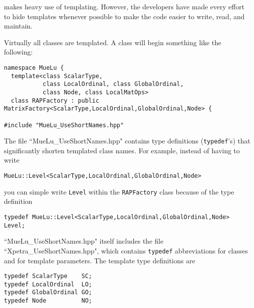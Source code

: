 \muelu makes heavy use of templating.  However, the developers have made every effort to hide templates
whenever possible to make the code easier to write, read, and maintain.

Virtually all \muelu classes are templated.  A class will begin something like the following:

\begin{verbatim}
namespace MueLu {
  template<class ScalarType,
           class LocalOrdinal, class GlobalOrdinal,
           class Node, class LocalMatOps>
  class RAPFactory : public MatrixFactory<ScalarType,LocalOrdinal,GlobalOrdinal,Node> {

#include "MueLu_UseShortNames.hpp"
\end{verbatim}
%
The file ``MueLu\_UseShortNames.hpp" contains type definitions (\verb!typedef!'s) that significantly shorten
templated class names.  For example, instead of having to write
\begin{verbatim}
MueLu::Level<ScalarType,LocalOrdinal,GlobalOrdinal,Node>
\end{verbatim}
you can simple write \verb!Level!  within the \verb!RAPFactory! class because of the type definition
\begin{verbatim}
typedef MueLu::Level<ScalarType,LocalOrdinal,GlobalOrdinal,Node> Level;
\end{verbatim}
``MueLu\_UseShortNames.hpp" itself includes the file ``Xpetra\_UseShortNames.hpp", which contains
\verb!typedef! abbreviations for \xpetra classes and for template parameters.  The template
type definitions are
%
\begin{verbatim}
typedef ScalarType    SC;
typedef LocalOrdinal  LO;
typedef GlobalOrdinal GO;
typedef Node          NO;
\end{verbatim}

